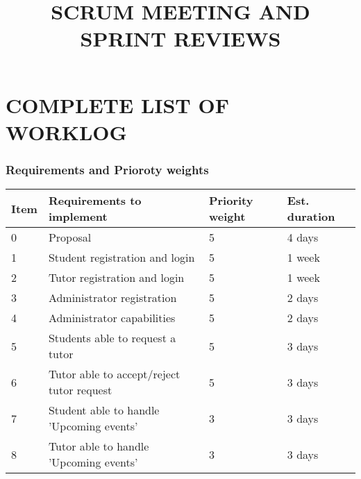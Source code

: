 \documentclass[12pt]{article}
\begin{document}
\title{\textbf{SCRUM MEETING AND SPRINT REVIEWS }}
\maketitle


\newpage




\tableofcontents
\newpage
\section{COMPLETE LIST OF WORKLOG }
\subsubsection{Requirements and Prioroty weights}
{
\centering
\begin{longtable}{| p{1.5cm} | p{8cm}| p{2cm}| p{3cm} |}
\hline			
			\textbf{Item} & \textbf{Requirements to implement} & \textbf{Priority weight}	& \textbf{Est. duration}	
			
	\\ \hline 0 & Proposal & 5 & 4 days
		\\ \hline 1 & Student registration and login & 5 & 1 week\\ \hline 
			
			2 & Tutor registration and login & 5 & 1 week\\ \hline	
 
			3 & Administrator registration & 5 & 2 days \\ \hline  

			
			4 & Administrator capabilities & 5 & 2 days\\ \hline 
			
			5 & Students able to request a tutor & 5 & 3 days\\ \hline

				6 & Tutor able to accept/reject tutor request & 5 & 3 days\\ \hline

				7 & Student able to handle 'Upcoming events'  & 3 & 3 days \\ \hline	
				
				8 & Tutor able to handle 'Upcoming events'  & 3 & 3 days\\ \hline	
							

\end{longtable}}
\end{document}
